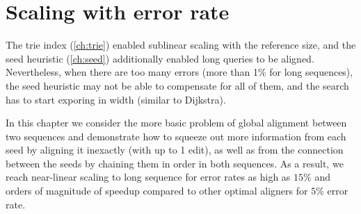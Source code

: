 \chapter{Scaling with error rate} \label{ch:global}

\graphicspath{{\dir/}}

The trie index (\cref{ch:trie}) enabled sublinear scaling with the reference
size, and the seed heuristic (\cref{ch:seed}) additionally enabled long queries
to be aligned. Nevertheless, when there are too many errors (more than 1\% for
long sequences), the seed heuristic may not be able to compensate for all of
them, and the search has to start exporing in width (similar to Dijkstra).

In this chapter we consider the more basic problem of global alignment between
two sequences and demonstrate how to squeeze out more information from each seed
by aligning it inexactly (with up to 1 edit), as well as from the connection
between the seeds by chaining them in order in both sequences. As a result, we
reach near-linear scaling to long sequence for error rates as high as $15\%$ and
orders of magnitude of speedup compared to other optimal aligners for $5\%$
error rate. 





